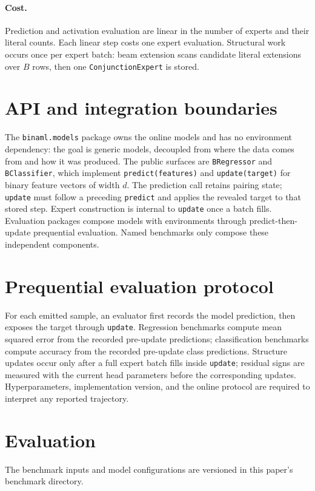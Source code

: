 \documentclass[11pt]{article}
\begin{document}
\paragraph{Cost.}
Prediction and activation evaluation are linear in the number of experts
and their literal counts.  Each linear step costs one expert evaluation.
Structural work occurs once per expert batch: beam extension scans candidate
literal extensions over $B$ rows, then one \texttt{ConjunctionExpert} is stored.

\section{API and integration boundaries}
The \texttt{binaml.models} package owns the online models and has no
environment dependency: the goal is generic models, decoupled from where the
data comes from and how it was produced.  The public surfaces are
\texttt{BRegressor} and \texttt{BClassifier}, which implement
\texttt{predict(features)} and \texttt{update(target)} for binary
feature vectors of width $d$.  The prediction call retains pairing state;
\texttt{update} must follow a preceding \texttt{predict} and applies the
revealed target to that stored step.  Expert construction
is internal to \texttt{update} once a batch fills.  Evaluation packages
compose models with environments through predict-then-update prequential
evaluation.  Named benchmarks only compose these independent components.

\section{Prequential evaluation protocol}
For each emitted sample, an evaluator first records the model prediction, then
exposes the target through \texttt{update}.  Regression benchmarks compute
mean squared error from the recorded pre-update predictions; classification
benchmarks compute accuracy from the recorded pre-update class predictions.
Structure updates occur only after a full expert batch fills inside
\texttt{update}; residual signs are measured with the current head parameters
before the corresponding updates.
Hyperparameters, implementation version, and the online protocol are required
to interpret any reported trajectory.

\section{Evaluation}
The benchmark inputs and model configurations are versioned in this paper's
benchmark directory.
\end{document}
